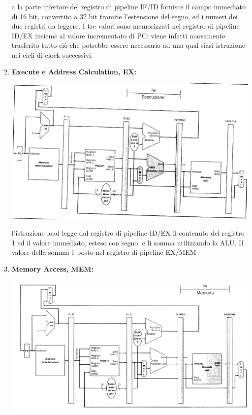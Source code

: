 \documentclass[a4paper,12pt, oneside]{book}
\begin{document}
\begin{enumerate}
\begin{center}
  \end{center}
  a la parte inferiore del registro di pipeline IF/ID fornisce il
  campo immediato di 16 bit, convertito a 32 bit tramite l'estensione del segno,
  ed i numeri dei due registri da leggere. I tre valori sono memorizzati nel
  registro di pipeline ID/EX insieme al valore incrementato di PC:
  viene infatti nuovamente trasferito tutto ciò che potrebbe essere 
  necessario ad una qual siasi istruzione nei cicli di clock
  successivi.
  \item \textbf{Execute e Address Calculation, EX:}
  \begin{center}
    \includegraphics[scale = 0.7]{img/pipe6.png}
  \end{center}
  l'istruzione load legge dal registro di pipeline ID/EX il
  contenuto del registro 1 ed il valore immediato, esteso con segno,
  e li somma utilizzando la ALU. Il valore della somma è posto nel
  registro di pipeline EX/MEM
  \item \textbf{Memory Access, MEM:}
  \begin{center}
    \includegraphics[scale = 0.7]{img/pipe7.png}
  \end{center}

\end{enumerate}
\end{document}
